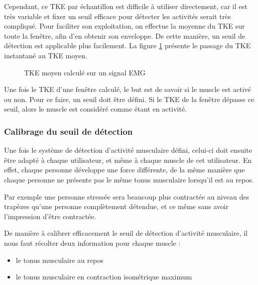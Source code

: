 \documentclass[letterpaper, twoside, 12pt, memoire, creativecommons, hyperref]{thETS}
\begin{document}
Cependant, ce TKE par échantillon est difficile à utiliser directement, car il est très variable et fixer un seuil efficace pour détecter les activités serait très compliqué. Pour faciliter son exploitation, on effectue la moyenne du TKE sur toute la fenêtre, afin d'en obtenir son enveloppe. De cette manière, un seuil de détection est applicable plus facilement. La figure \ref{fig:tkemoy} présente le passage du TKE instantané au TKE moyen.

\begin{figure}
	\centering
	\caption{TKE moyen calculé sur un signal EMG}
	\label{fig:tkemoy}
\end{figure}

Une fois le TKE d'une fenêtre calculé, le but est de savoir si le muscle est activé ou non. Pour ce faire, un seuil doit être défini. Si le TKE de la fenêtre dépasse ce seuil, alors le muscle est considéré comme étant en activité.

\subsubsection{Calibrage du seuil de détection}

Une fois le système de détection d'activité musculaire défini, celui-ci doit ensuite être adapté à chaque utilisateur, et même à chaque muscle de cet utilisateur. En effet, chaque personne développe une force différente, de la même manière que chaque personne ne présente pas le même tonus musculaire lorsqu'il est au repos. 

Par exemple une personne stressée sera beaucoup plus contractée au niveau des trapèzes qu'une personne complètement détendue, et ce même sans avoir l'impression d'être contractée.

De manière à calibrer efficacement le seuil de détection d'activité musculaire, il nous faut récolter deux information pour chaque muscle : 

\begin{itemize}
 \item le tonus musculaire au repos
 \item le tonus musculaire en contraction isométrique maximum
\end{itemize}
\end{document}
